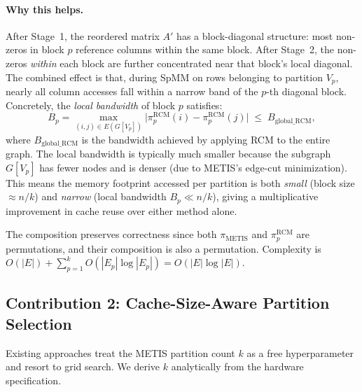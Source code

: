 \documentclass[sigconf,review]{acmart}
\begin{document}
\paragraph{Why this helps.} After Stage~1, the reordered matrix $A'$ has a block-diagonal structure: most non-zeros in block $p$ reference columns within the same block. After Stage~2, the non-zeros \emph{within} each block are further concentrated near that block's local diagonal. The combined effect is that, during SpMM on rows belonging to partition $V_p$, nearly all column accesses fall within a narrow band of the $p$-th diagonal block. Concretely, the \emph{local bandwidth} of block $p$ satisfies:
\begin{equation}\label{eq:local_bw}
    B_p = \max_{(i,j)\in E(G[V_p])} \bigl|\pi_p^{\text{RCM}}(i) - \pi_p^{\text{RCM}}(j)\bigr| \;\le\; B_{\text{global\_RCM}},
\end{equation}
where $B_{\text{global\_RCM}}$ is the bandwidth achieved by applying RCM to the entire graph. The local bandwidth is typically much smaller because the subgraph $G[V_p]$ has fewer nodes and is denser (due to METIS's edge-cut minimization). This means the memory footprint accessed per partition is both \emph{small} (block size $\approx n/k$) and \emph{narrow} (local bandwidth $B_p \ll n/k$), giving a multiplicative improvement in cache reuse over either method alone.

The composition preserves correctness since both $\pi_{\text{METIS}}$ and $\pi_p^{\text{RCM}}$ are permutations, and their composition is also a permutation. Complexity is $O(|E|) + \sum_{p=1}^{k} O(|E_p| \log |E_p|) = O(|E| \log |E|)$.

\subsection{Contribution 2: Cache-Size-Aware Partition Selection}
\label{sec:cache_aware}

Existing approaches treat the METIS partition count $k$ as a free hyperparameter and resort to grid search. We derive $k$ analytically from the hardware specification.
\end{document}
